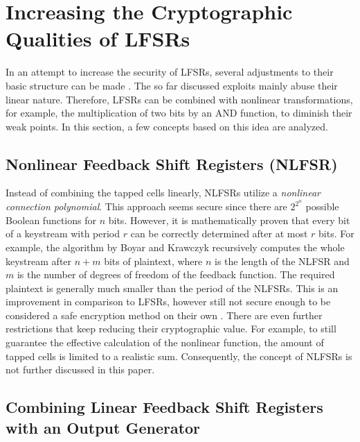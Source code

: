 
\section{Increasing the Cryptographic Qualities of LFSRs}

In an attempt to increase the security of LFSRs, several adjustments to their basic structure can be made \cite[p. 97]{Pommerening.2000}. The so far discussed exploits mainly abuse their linear nature. Therefore, LFSRs can be combined with nonlinear transformations, for example, the multiplication of two bits by an AND function, to diminish their weak points. In this section, a few concepts based on this idea are analyzed.

\subsection{Nonlinear Feedback Shift Registers (NLFSR)}\label{NLFSR}

Instead of combining the tapped cells linearly, NLFSRs utilize a \emph{nonlinear connection polynomial}. This approach seems secure since there are $2^{2^n}$ possible Boolean functions for $n$ bits. However, it is mathematically proven that every bit of a keystream with period $r$ can be correctly determined after at most $r$ bits. For example, the algorithm by Boyar and Krawczyk recursively computes the whole keystream after $n+m$ bits of plaintext, where $n$ is the length of the NLFSR and $m$ is the number of degrees of freedom of the feedback function. The required plaintext is generally much smaller than the period of the NLFSRs. This is an improvement in comparison to LFSRs, however still not secure enough to be considered a safe encryption method on their own \cite[p. 97]{Pommerening.2000}. There are even further restrictions that keep reducing their cryptographic value. For example, to still guarantee the effective calculation of the nonlinear function, the amount of tapped cells is limited to a realistic sum. \cite{Pommerening.2015} Consequently, the concept of NLFSRs is not further discussed in this paper.  \\

\subsection{Combining Linear Feedback Shift Registers with an Output Generator}

